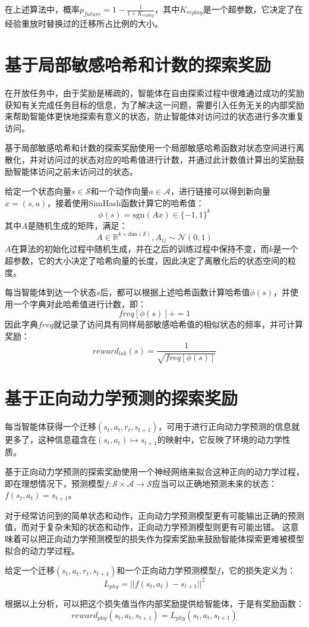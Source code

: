     在上述算法中，概率$p_{future}=1-\frac{1}{1+K_{replay}}$，其中$K_{replay}$是一个超参数，它决定了在经验重放时替换过的迁移所占比例的大小。

    \section{基于局部敏感哈希和计数的探索奖励}\label{LSHsec}
    在开放任务中，由于奖励是稀疏的，智能体在自由探索过程中很难通过成功的奖励获知有关完成任务目标的信息，为了解决这一问题，需要引入任务无关的内部奖励来帮助智能体更快地探索有意义的状态，防止智能体对访问过的状态进行多次重复访问。

    基于局部敏感哈希和计数的探索奖励\cite{DBLP:journals/corr/TangHFSCDSTA16}使用一个局部敏感哈希函数对状态空间进行离散化，并对访问过的状态对应的哈希值进行计数，并通过此计数值计算出的奖励鼓励智能体访问之前未访问过的状态。

    给定一个状态向量$s\in \mathcal S$和一个动作向量$a\in \mathcal A$，进行链接可以得到新向量$x=(s,a)$，接着使用SimHash函数计算它的哈希值：
    $$\phi(s)=\mathrm{sgn}(A x)\in\{-1,1\}^k$$
    其中$A$是随机生成的矩阵，满足：
    $$A\in \mathbb R^{k\times \mathrm{dim}(\mathcal S)}, A_{ij}\sim \mathcal N(0,1)$$ 
    $A$在算法的初始化过程中随机生成，并在之后的训练过程中保持不变，而$k$是一个超参数，它的大小决定了哈希向量的长度，因此决定了离散化后的状态空间的粒度。

    每当智能体到达一个状态$s$后，都可以根据上述哈希函数计算哈希值$\phi(s)$，并使用一个字典对此哈希值进行计数，即：
    $$freq[\phi(s)] += 1$$
    因此字典$freq$就记录了访问具有同样局部敏感哈希值的相似状态的频率，并可计算奖励：
    $$ reward_{lsh}(s)=\frac{1}{\sqrt{freq[\phi(s)]}}$$ 


    \section{基于正向动力学预测的探索奖励}
    每当智能体获得一个迁移$(s_t, a_t, r_t, s_{t+1})$，可用于进行正向动力学预测的信息就更多了，这种信息蕴含在$(s_t,a_t)\mapsto s_{t+1}$的映射中，它反映了环境的动力学性质。
    
    基于正向动力学预测的探索奖励\cite{DBLP:journals/corr/StadieLA15}使用一个神经网络来拟合这种正向的动力学过程，即在理想情况下，预测模型$f:\mathcal S\times \mathcal A\to \mathcal S$应当可以正确地预测未来的状态：$f(s_t, a_t) = s_{t+1}$。

    对于经常访问到的简单状态和动作，正向动力学预测模型更有可能输出正确的预测值，而对于复杂未知的状态和动作，正向动力学预测模型则更有可能出错。
    这意味着可以把正向动力学预测模型的损失作为探索奖励来鼓励智能体探索更难被模型拟合的动力学过程。

    给定一个迁移$(s_t, a_t, r_t, s_{t+1})$和一个正向动力学预测模型$f$，它的损失定义为：
    $$ L_{phy} = ||f(s_t, a_t) - s_{t+1}||^2$$ 

    根据以上分析，可以把这个损失值当作内部奖励提供给智能体，于是有奖励函数：
    $$ reward_{phy}(s_t, a_t, s_{t+1}) =  L_{phy}(s_t, a_t, s_{t+1}) $$ 
